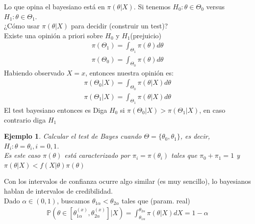 \documentclass[10pt]{article}
\theoremstyle{plain}
\newtheorem{ej}{Ejemplo}
\theoremstyle{definition}
\begin{document}
\begin{etaremune}
\item Lo que opina el bayesiano está en $\pi(\theta|X)$. Si tenemos $H_{0}:\theta\in \Theta_{0}$ versus $H_{1}:\theta\in \Theta_{1}$.\\
¿Cómo usar $\pi(\theta|X)$ para decidir (construir un test)?\\

Existe una opinión a priori sobre $H_{0}$ y $H_{1}$(prejuicio)
\begin{align*}
\pi(\Theta_{1}) = \int_{\Theta_{1}}\pi(\theta)d\theta\\
\pi(\Theta_{0}) = \int_{\Theta_{0}}\pi(\theta)d\theta
\end{align*}
Habiendo observado $X=x$, entonces nuestra opinión es:
\begin{align*}
\pi(\Theta_{0}|X) = \int_{\Theta_{0}}\pi(\theta|X)d\theta\\
\pi(\Theta_{1}|X) = \int_{\Theta_{1}}\pi(\theta|X)d\theta
\end{align*}
El test bayesiano entonces es Diga $H_{0}$ si $\pi(\Theta_{0}|X) > \pi(\Theta_{1}|X)$, en caso contrario diga $H_{1}$
\begin{ej}
Calcular el test de Bayes cuando $\Theta = \{\theta_{0},\theta_{1}\}$, es decir, $H_{i}: \theta = \theta_{i}, i = 0,1$.\\
Es este caso $\pi(\theta)$ está caracterizado por $\pi_{i} = \pi(\theta_{i})$ tales que $\pi_{0}+\pi_{1}=1$ y $\pi(\theta|X) < f(X|\theta)\pi(\theta)$
\end{ej}
\item Con los intervalos de confianza ocurre algo similar (es muy sencillo), lo bayesianos hablan de intervalos de credibilidad.\\
Dado $\alpha \in (0,1)$, buscamos $\theta_{1\alpha}<\theta_{2\alpha}$ tales que (param. real)
\begin{align*}
\mathbb{P}(\theta \in [\theta_{1\alpha}^{(x)},\theta_{2\alpha}^{(x)}]|X) = \int_{\theta_{1\alpha}}^{\theta_{2\alpha}}\pi(\theta|X)dX = 1-\alpha
\end{align*}
\begin{center}

\end{center}
\end{etaremune}
\end{document}
